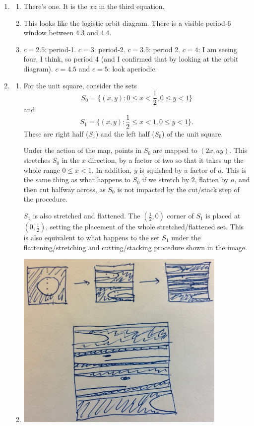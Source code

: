 \documentclass[12pt,letterpaper,noanswers]{exam}
\begin{document}
\begin{enumerate}
\item
\begin{enumerate}
    \item There's one.  It is the $xz$ in the third equation.
    \item This looks like the logistic orbit diagram.  There is a visible period-6 window between $4.3$ and $4.4$.
    \item $c=2.5$: period-1.  $c = 3$: period-2.  $c=3.5$: period 2.  $c = 4$: I am seeing four, I think, so period 4 (and I confirmed that by looking at the orbit diagram).  $c= 4.5$ and $c=5$: look aperiodic.
\end{enumerate}


\item
\begin{enumerate}
 \item For the unit square, consider the sets \[S_0=\{(x,y): 0\leq x < \frac{1}{2}, 0\leq y < 1\}\]
 and \[S_1=\{(x,y): \frac{1}{2} \leq x < 1, 0\leq y < 1\}.\]  These are right half ($S_1$) and the left half ($S_0$) of the unit square.
 
 Under the action of the map, points in $S_0$ are mapped to $(2x, ay)$.  This stretches $S_0$ in the $x$ direction, by a factor of two so that it takes up the whole range $0\leq x < 1$.  In addition, $y$ is squished by a factor of $a$.  This is the same thing as what happens to $S_0$
 if we stretch by $2$, flatten by $a$, and then cut halfway across, as $S_0$ is not impacted by the cut/stack step of the procedure.

$S_1$ is also stretched and flattened.  The $(\frac{1}{2},0)$ corner of $S_1$
 is placed at $(0, \frac{1}{2})$, setting the placement of the whole stretched/flattened set.  This is also equivalent to
 what happens to the set $S_1$ under the flattening/stretching and cutting/stacking procedure shown in the image.
 \item 
 
 \includegraphics[width=4in]{img/C22bakers.png}
 

\end{enumerate}
\end{enumerate}
\end{document}
